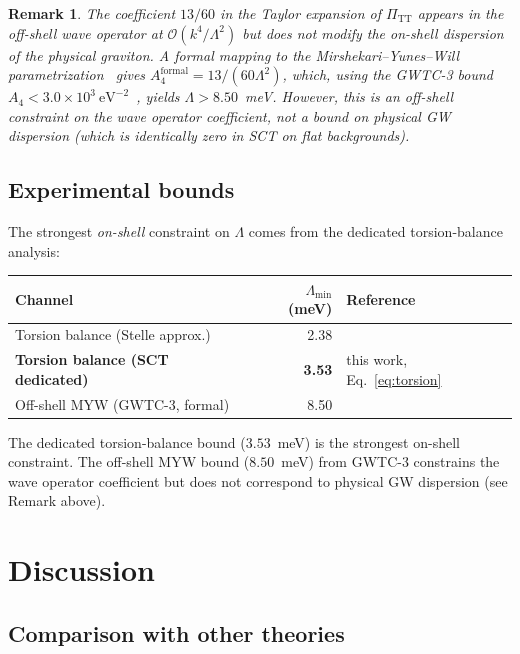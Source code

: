 \documentclass[12pt,a4paper]{article}
\newtheorem{remark}[theorem]{Remark}
\newcommand{\Lam}{\Lambda}
\newcommand{\PiTT}{\Pi_{\mathrm{TT}}}
\begin{document}
\begin{remark}
The coefficient $13/60$ in the Taylor expansion of $\PiTT$ appears in
the off-shell wave operator at $\mathcal{O}(k^4/\Lam^2)$ but does
\emph{not} modify the on-shell dispersion of the physical graviton.
A formal mapping to the Mirshekari--Yunes--Will
parametrization~\cite{MYW2012} gives $A_4^{\mathrm{formal}} = 13/(60\Lam^2)$,
which, using the GWTC-3 bound $A_4 < 3.0 \times 10^3~\mathrm{eV}^{-2}$~\cite{GWTC3},
yields $\Lam > 8.50$~meV. However, this is an off-shell constraint
on the wave operator coefficient, not a bound on physical GW
dispersion (which is identically zero in SCT on flat backgrounds).
\end{remark}


\subsection{Experimental bounds}

The strongest \emph{on-shell} constraint on $\Lam$ comes from the
dedicated torsion-balance analysis:
\begin{center}
\begin{tabular}{lrl}
\toprule
Channel & $\Lam_{\min}$ (meV) & Reference \\
\midrule
Torsion balance (Stelle approx.) & 2.38 & \cite{Alfyorov2025b} \\
\textbf{Torsion balance (SCT dedicated)} & \textbf{3.53} & this work, Eq.~\eqref{eq:torsion} \\
Off-shell MYW (GWTC-3, formal) & 8.50 & \cite{GWTC3} \\
\bottomrule
\end{tabular}
\end{center}
The dedicated torsion-balance bound ($3.53$~meV) is the strongest
on-shell constraint. The off-shell MYW bound ($8.50$~meV) from GWTC-3
constrains the wave operator coefficient but does not correspond to
physical GW dispersion (see Remark above).


\section{Discussion}
\label{sec:discussion}

\subsection{Comparison with other theories}
\end{document}
